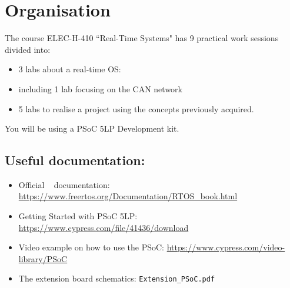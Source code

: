 \section*{Organisation}
The course ELEC-H-410 ``Real-Time Systems" has 9 practical work sessions divided into:
\begin{itemize}
    \item 3 labs about a real-time OS: \rtos~
    \item including 1 lab focusing on the CAN network
    \item 5 labs to realise a project using the concepts previously acquired.
\end{itemize}
You will be using a PSoC 5LP Development kit.
 
\subsection*{Useful documentation:}
\begin{itemize}
    \item Official \rtos~ documentation: \url{https://www.freertos.org/Documentation/RTOS_book.html}
    \item Getting Started with PSoC 5LP: \url{https://www.cypress.com/file/41436/download}
    \item Video example on how to use the PSoC: \url{https://www.cypress.com/video-library/PSoC}
    \item The extension board schematics: \texttt{Extension\_PSoC.pdf}
\end{itemize}